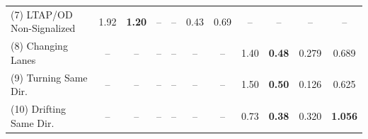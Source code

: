 \begin{table}[t]
\begin{tabular}{@{}l cc cc cc cc cc@{}}
\rowcolor{green!5}
(7) LTAP/OD Non-Signalized    & 1.92 & \textbf{1.20} & -- & -- & 0.43 & 0.69 & -- & -- & -- & -- \\
\rowcolor{orange!5}
(8) Changing Lanes             & -- & -- & -- & -- & -- & -- & 1.40 & \textbf{0.48} & 0.279 & 0.689 \\
\rowcolor{orange!5}
(9) Turning Same Dir.          & -- & -- & -- & -- & -- & -- & 1.50 & \textbf{0.50} & 0.126 & 0.625 \\
\rowcolor{orange!5}
(10) Drifting Same Dir.        & -- & -- & -- & -- & -- & -- & 0.73 & \textbf{0.38} & 0.320 & \textbf{1.056} \\
\bottomrule
\end{tabular}
\end{table}
